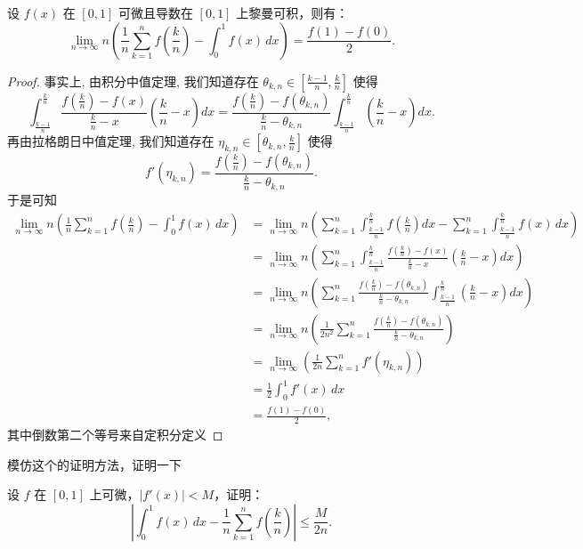 \documentclass[lang=cn,10pt,thmcnt=section]{elegantbook}
\begin{document}
\begin{example}
	设 \( f(x) \) 在 \([0,1]\) 可微且导数在 \([0,1]\) 上黎曼可积，则有：
	\[
	\lim_{n \to \infty} n \left( \frac{1}{n} \sum_{k=1}^n f\left(\frac{k}{n}\right) - \int_0^1 f(x) \, dx \right) = \frac{f(1) - f(0)}{2}.
	\]
	\end{example}
	\begin{proof}
	事实上, 由积分中值定理, 我们知道存在 $\theta_{k,n} \in [\frac{k-1}{n}, \frac{k}{n}]$ 使得
	\[
	\int_{\frac{k-1}{n}}^{\frac{k}{n}} \frac{f(\frac{k}{n}) - f(x)}{\frac{k}{n} - x} \left(\frac{k}{n} - x\right) dx = \frac{f(\frac{k}{n}) - f(\theta_{k,n})}{\frac{k}{n} - \theta_{k,n}} \int_{\frac{k-1}{n}}^{\frac{k}{n}} \left(\frac{k}{n} - x\right) dx.
	\]
	再由拉格朗日中值定理, 我们知道存在 $\eta_{k,n} \in [\theta_{k,n}, \frac{k}{n}]$ 使得
	\[
	f'(\eta_{k,n}) = \frac{f(\frac{k}{n}) - f(\theta_{k,n})}{\frac{k}{n} - \theta_{k,n}}.
	\]
	于是可知
	\begin{align*}
	\lim_{n\to\infty} n \left( \frac{1}{n} \sum_{k=1}^n f\left(\frac{k}{n}\right) - \int_0^1 f(x) \, dx \right) &= \lim_{n\to\infty} n \left( \sum_{k=1}^n \int_{\frac{k-1}{n}}^{\frac{k}{n}} f\left(\frac{k}{n}\right) dx - \sum_{k=1}^n \int_{\frac{k-1}{n}}^{\frac{k}{n}} f(x) \, dx \right) \\
	&= \lim_{n\to\infty} n \left( \sum_{k=1}^n \int_{\frac{k-1}{n}}^{\frac{k}{n}} \frac{f(\frac{k}{n}) - f(x)}{\frac{k}{n} - x} \left(\frac{k}{n} - x\right) dx \right) \\
	&= \lim_{n\to\infty} n \left( \sum_{k=1}^n \frac{f(\frac{k}{n}) - f(\theta_{k,n})}{\frac{k}{n} - \theta_{k,n}} \int_{\frac{k-1}{n}}^{\frac{k}{n}} \left(\frac{k}{n} - x\right) dx \right) \\
	&= \lim_{n\to\infty} n \left( \frac{1}{2n^2} \sum_{k=1}^n \frac{f(\frac{k}{n}) - f(\theta_{k,n})}{\frac{k}{n} - \theta_{k,n}} \right) \\
	&= \lim_{n\to\infty} \left( \frac{1}{2n} \sum_{k=1}^n f'(\eta_{k,n}) \right) \\
	&= \frac{1}{2} \int_0^1 f'(x) \, dx \\
	&= \frac{f(1)-f(0)}{2},
	\end{align*}
	其中倒数第二个等号来自定积分定义
	\end{proof}模仿这个的证明方法，证明一下\begin{example}
	设 \( f \) 在 \([0,1]\) 上可微，\(\left|f'(x)\right| < M\)，证明：
	\[
	\left|\int_0^1 f(x) \, dx - \frac{1}{n} \sum_{k=1}^n f\left(\frac{k}{n}\right)\right| \leq \frac{M}{2n}.\]
	\end{example}
\end{document}

